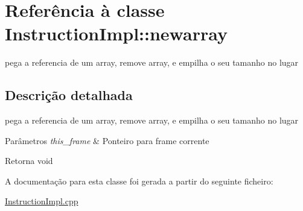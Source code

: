 \hypertarget{class_instruction_impl_1_1newarray}{}\section{Referência à classe Instruction\+Impl\+:\+:newarray}
\label{class_instruction_impl_1_1newarray}


pega a referencia de um array, remove array, e empilha o seu tamanho no lugar  




\subsection{Descrição detalhada}
pega a referencia de um array, remove array, e empilha o seu tamanho no lugar 


\begin{DoxyParams}{Parâmetros}
{\em this\+\_\+frame} & Ponteiro para frame corrente \\
\hline
\end{DoxyParams}
\begin{DoxyReturn}{Retorna}
void 
\end{DoxyReturn}


A documentação para esta classe foi gerada a partir do seguinte ficheiro\+:\begin{DoxyCompactItemize}
\item 
\hyperlink{_instruction_impl_8cpp}{Instruction\+Impl.\+cpp}\end{DoxyCompactItemize}
